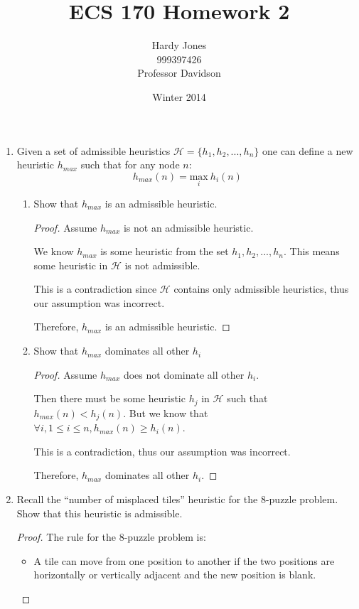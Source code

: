 \documentclass[12pt,letterpaper]{article}
\title{ECS 170 Homework 2\vspace{-2ex}}
\author{Hardy Jones\\
        999397426\\
        Professor Davidson\vspace{-2ex}}
\date{Winter 2014}
\begin{document}
  \maketitle

  \begin{enumerate}
    \item
      Given a set of admissible heuristics $\mathcal{H} = \{h_1, h_2, ..., h_n\}$ one can define a new heuristic $h_{max}$ such that for any node $n$:
      \[
        h_{max}(n) = \underset{i}{\text{max}} \ h_i(n)
      \]
      \begin{enumerate}
        \item Show that $h_{max}$ is an admissible heuristic.

          \begin{proof}
            Assume $h_{max}$ is not an admissible heuristic.

            We know $h_{max}$ is some heuristic from the set $h_1, h_2, ..., h_n$.
            This means some heuristic in $\mathcal{H}$ is not admissible.

            This is a contradiction since $\mathcal{H}$ contains only admissible heuristics,
            thus our assumption was incorrect.

            Therefore, $h_{max}$ is an admissible heuristic.
          \end{proof}
        \item Show that $h_{max}$ dominates all other $h_i$

          \begin{proof}
            Assume $h_{max}$ does not dominate all other $h_i$.

            Then there must be some heuristic $h_j$ in $\mathcal{H}$ such that $h_{max}(n) < h_j(n)$.
            But we know that $\forall i, 1 \le i \le n, h_{max}(n) \ge h_i(n)$.

            This is a contradiction, thus our assumption was incorrect.

            Therefore, $h_{max}$ dominates all other $h_i$.
          \end{proof}
      \end{enumerate}

    \item
      Recall the ``number of misplaced tiles'' heuristic for the 8-puzzle problem.
      Show that this heuristic is admissible.

      \begin{proof}
        The rule for the 8-puzzle problem is:
        \begin{itemize}
          \item A tile can move from one position to another if the two positions are horizontally or vertically adjacent and the new position is blank.
        \end{itemize}


\end{proof}
\end{enumerate}
\end{document}
